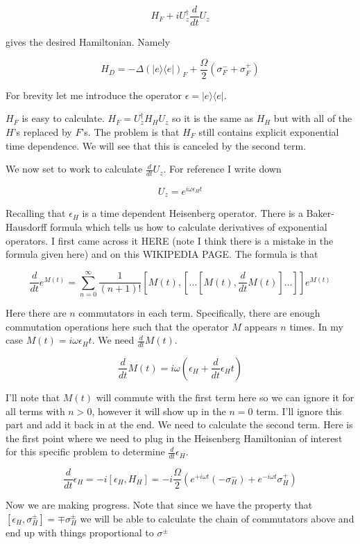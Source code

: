 \documentclass[12pt]{article}
\begin{document}
$$
H_F + i U_z^{\dagger} \frac{d}{dt}U_z
$$

gives the desired Hamiltonian. Namely

$$
H_D = -\Delta (|e\rangle \langle e|)_F + \frac{\Omega}{2}\left(\sigma^-_F + \sigma^+_F \right)
$$

For brevity let me introduce the operator $\epsilon = |e\rangle \langle e|$. 

$H_F$ is easy to calculate. $H_F = U_z^{\dagger} H_H U_z$ so it is the same as $H_H$ but with all of the $H$'s replaced by $F$'s. The problem is that $H_F$ still contains explicit exponential time dependence. We will see that this is canceled by the second term.

We now set to work to calculate $\frac{d}{dt}U_z$. For reference I write down

$$
U_z = e^{i \omega \epsilon_H t}
$$

Recalling that $\epsilon_H$ is a time dependent Heisenberg operator. There is a Baker-Hausdorff formula which tells us how to calculate derivatives of exponential operators. I first came across it HERE (note I think there is a mistake in the formula given here) and on this WIKIPEDIA PAGE. The formula is that

$$
\frac{d}{dt} e^{M(t)} = \sum_{n=0}^{\infty} \frac{1}{(n+1)!} \left[M(t),\left[\ldots\left[M(t),\frac{d}{dt}M(t)\right]\ldots \right]\right] e^{M(t)}
$$

Here there are $n$ commutators in each term. Specifically, there are enough commutation operations here such that the operator $M$ appears $n$ times.
In my case $M(t) = i \omega \epsilon_H t$. We need $\frac{d}{dt}M(t)$.

$$
\frac{d}{dt}M(t) = i\omega\left(\epsilon_H + \frac{d}{dt}\epsilon_H t\right)
$$

I'll note that $M(t)$ will commute with the first term here so we can ignore it for all terms with $n>0$, however it will show up in the $n=0$ term. I'll ignore this part and add it back in at the end. We need to calculate the second term. Here is the first point where we need to plug in the Heisenberg Hamiltonian of interest for this specific problem to determine $\frac{d}{dt}\epsilon_H$.

$$
\frac{d}{dt}\epsilon_H = -i[\epsilon_H, H_H] = -i\frac{\Omega}{2}\left(e^{+i\omega t}(-\sigma^-_H) + e^{-i\omega t}\sigma^+_H \right)
$$

Now we are making progress. Note that since we have the property that $[\epsilon_H,\sigma_H^{\pm}] = \mp \sigma_H^{\pm}$ we will be able to calculate the chain of commutators above and end up with things proportional to $\sigma^{\pm}$
\end{document}
